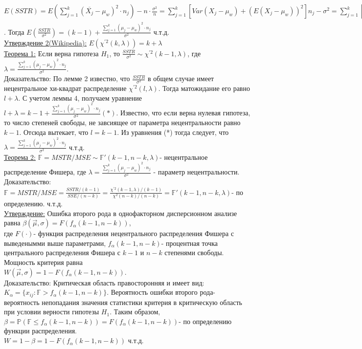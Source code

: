 \documentclass[a4paper]{article}
\begin{document}
$E(SSTR) = E(\sum\limits_{j = 1}^{k}(\overline{X_j} - \mu_w)^2\cdot n_j) - n\cdot\frac{\sigma^2}{n} = \sum\limits_{j = 1}^{k}[Var(X_j - \mu_w) + (E(X_j - \mu_w))^2]n_j - \sigma^2 = \sum\limits_{j = 1}^{k}[Var(\overline{X_j}) + (E(\overline{X_j}) - \mu_w)^2]n_j - \sigma^2 = \sum\limits_{j = 1}^{k}[\frac{\sigma^2}{n_j} + (\mu_j - \mu_w)^2]n_j - \sigma^2 = \sum\limits_{j = 1}^{k}[\sigma^2 + (\mu_j - \mu_w)^2\cdot n_j] - \sigma^2 = k\cdot\sigma^2 - \sigma^2 + \sum\limits_{j = 1}^{k}(\mu_j - \mu_w)^2\cdot n_j = (k - 1)\sigma^2 + \sum\limits_{j = 1}^{k}(\mu_j - \mu_w)^2\cdot n_j$. Тогда $E(\frac{SSTR}{\sigma^2}) = (k - 1) + \frac{\sum\limits_{j = 1}^{k}(\mu_j - \mu_w)^2\cdot n_j}{\sigma^2}$ ч.т.д.\\
\underline{Утверждение 2(Wikipedia):} $E(\chi^{'2}(k, \lambda)) = k + \lambda$\\
\underline{Теорема 1:} Если верна гипотеза $H_1$, то $\frac{SSTR}{\sigma^2}\sim \chi^{'2}(k - 1, \lambda)$, где $\lambda = \frac{\sum\limits_{j = 1}^{k}(\mu_j - \mu_w)^2\cdot n_j}{\sigma^2}$.\\
Доказательство: По лемме 2 известно, что $\frac{SSTR}{\sigma^2}$ в общем случае имеет нецентральное хи-квадрат распределение $\chi^{'2}(l, \lambda)$. Тогда матожидание его равно $l + \lambda$. С учетом леммы 4, получаем уравнение $l + \lambda = k - 1 + \frac{\sum\limits_{j = 1}^{k}(\mu_j - \mu_w)^2\cdot n_j}{\sigma^2}(*)$. Известно, что если верна нулевая гипотеза, то число степеней свободы, не завсиящее от параметра нецентральности равно $k - 1$. Отсюда вытекает, что $l = k - 1$. Из уравнения (*) тогда следует, что $\lambda = \frac{\sum\limits_{j = 1}^{k}(\mu_j - \mu_w)^2\cdot n_j}{\sigma^2}$ ч.т.д.\\
\underline{Теорема 2:} $\mathbb{F} = MSTR/MSE \sim \mathbb{F}'(k - 1, n - k, \lambda)$- нецентральное распределение Фишера, где $\lambda = \frac{\sum\limits_{j = 1}^{k}(\mu_j - \mu_w)^2\cdot n_j}{\sigma^2}$ - параметр нецентральности.\\
Доказательство: $\mathbb{F} = MSTR/MSE = \frac{SSTR/(k - 1)}{SSE/(n - k)} = \frac{\chi^{'2}(k - 1, \lambda)/(k - 1)}{\chi^{2}(n - k)/(n - k)} = \mathbb{F}'(k - 1, n - k, \lambda)$- по определению. ч.т.д.\\
\underline{Утверждение:} Ошибка второго рода в однофакторном дисперсионном анализе равна $\beta(\overrightarrow{\mu}, \sigma) = F(f_{\alpha}(k - 1, n - k))$,\\ где $F(\cdot)$- функция распределения нецентрального распределения Фишера с выведенымми выше параметрами, $f_{\alpha}(k - 1, n - k)$- процентная точка центрального распределения Фишера с $k - 1$ и $n - k$ степенями свободы. Мощность критерия равна \\$W(\overrightarrow{\mu}, \sigma) = 1 - F(f_{\alpha}(k - 1, n - k))$. \\
Доказательство: Критическая область правосторонняя и имеет вид: $K_{\alpha} = \{x_{ij}: \mathbb{F} > f_{\alpha}(k - 1, n - k)\}$. Вероятность ошибки второго рода- вероятность непопадания значения статистики критерия в критическую область при условии верности гипотезы $H_1$. Таким образом, $\beta = \mathbb{P}(\mathbb{F} \leq f_{\alpha}(k - 1, n - k)) = F(f_{\alpha}(k - 1, n - k))$- по определению функции распределения.\\
$W = 1 - \beta = 1 - F(f_{\alpha}(k - 1, n - k))$ ч.т.д.
\end{document}
